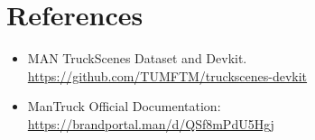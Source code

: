 \documentclass[10pt, a4paper, oneside]{article}
\begin{document}
\section*{References}
\begin{itemize}
    \item MAN TruckScenes Dataset and Devkit. \url{https://github.com/TUMFTM/truckscenes-devkit}
    \item ManTruck Official Documentation: \url{https://brandportal.man/d/QSf8mPdU5Hgj}
\end{itemize}
	
	
\end{document}
